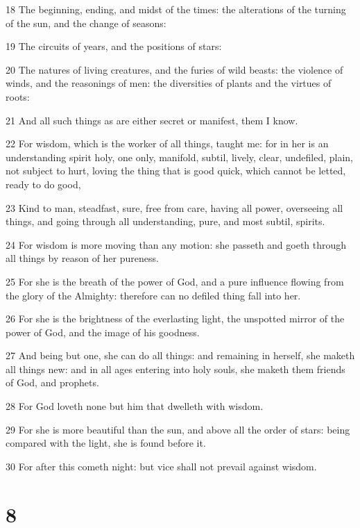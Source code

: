 \par 18 The beginning, ending, and midst of the times: the alterations of the turning of the sun, and the change of seasons:
\par 19 The circuits of years, and the positions of stars:
\par 20 The natures of living creatures, and the furies of wild beasts: the violence of winds, and the reasonings of men: the diversities of plants and the virtues of roots:
\par 21 And all such things as are either secret or manifest, them I know.
\par 22 For wisdom, which is the worker of all things, taught me: for in her is an understanding spirit holy, one only, manifold, subtil, lively, clear, undefiled, plain, not subject to hurt, loving the thing that is good quick, which cannot be letted, ready to do good,
\par 23 Kind to man, steadfast, sure, free from care, having all power, overseeing all things, and going through all understanding, pure, and most subtil, spirits.
\par 24 For wisdom is more moving than any motion: she passeth and goeth through all things by reason of her pureness.
\par 25 For she is the breath of the power of God, and a pure influence flowing from the glory of the Almighty: therefore can no defiled thing fall into her.
\par 26 For she is the brightness of the everlasting light, the unspotted mirror of the power of God, and the image of his goodness.
\par 27 And being but one, she can do all things: and remaining in herself, she maketh all things new: and in all ages entering into holy souls, she maketh them friends of God, and prophets.
\par 28 For God loveth none but him that dwelleth with wisdom.
\par 29 For she is more beautiful than the sun, and above all the order of stars: being compared with the light, she is found before it.
\par 30 For after this cometh night: but vice shall not prevail against wisdom.

\chapter{8}

